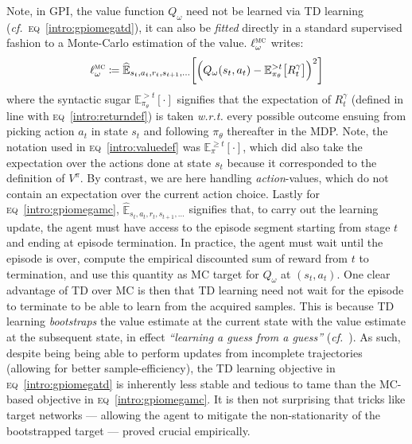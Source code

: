 Note, in GPI, the value function $Q_\omega$ need not be learned via TD learning
(\textit{cf.}~\textsc{eq}~\ref{intro:gpiomegatd}),
it can also be \emph{fitted}
directly in a standard supervised fashion to a Monte-Carlo estimation of the value.
$\ell_\omega^\textsc{mc}$ writes:
\begin{align}
\ell_\omega^\textsc{mc}
\coloneqq
\widehat{\mathbb{E}}_{s_t,a_t,r_t,s_{t+1}, \ldots}
\bigg[
\Big(
Q_\omega(s_t,a_t) -
\mathbb{E}_{\pi_\theta}^{> t} \big[R_t^\gamma\big]
\Big)^2
\bigg]
\label{intro:gpiomegamc}
\end{align}
where the syntactic sugar $\mathbb{E}_{\pi_\theta}^{> t} [\cdot]$ signifies that the expectation of $R_t^\gamma$
(defined in line with \textsc{eq}~\ref{intro:returndef}) is taken
\textit{w.r.t.} every possible outcome ensuing from picking action $a_t$ in state $s_t$
and following $\pi_\theta$ thereafter
in the MDP.
Note, the notation used in \textsc{eq}~\ref{intro:valuedef} was $\mathbb{E}_{\pi}^{\geq t} [\cdot]$,
which did also take the expectation over the actions done at state $s_t$ because it corresponded to
the definition of $V^\pi$. By contrast, we are here handling \emph{action}-values, which
do not contain an expectation over the current action choice.
Lastly for \textsc{eq}~\ref{intro:gpiomegamc},
$\widehat{\mathbb{E}}_{s_t,a_t,r_t,s_{t+1}, \ldots}$ signifies that, to carry out the learning update,
the agent must have access to the episode segment starting from stage $t$ and ending at episode termination.
In practice, the agent must wait until the episode is over, compute the empirical discounted sum of reward
from $t$ to termination, and use this quantity as MC target for $Q_\omega$ at $(s_t,a_t)$.
One clear advantage of TD over MC is then that TD learning need not wait for the episode to terminate to
be able to learn from the acquired samples.
This is because TD learning \emph{bootstraps} the value estimate at the current state with the value estimate
at the subsequent state, in effect \textit{``learning a guess from a guess''} (\textit{cf.}~\cite{Sutton1998-ow}).
As such, despite being being able to perform updates from incomplete trajectories (allowing for better
sample-efficiency), the TD learning objective in \textsc{eq}~\ref{intro:gpiomegatd} is inherently
less stable and tedious to tame than the MC-based objective in \textsc{eq}~\ref{intro:gpiomegamc}.
It is then not surprising that tricks like target networks --- allowing the agent to mitigate
the non-stationarity of the bootstrapped target --- proved crucial empirically.

